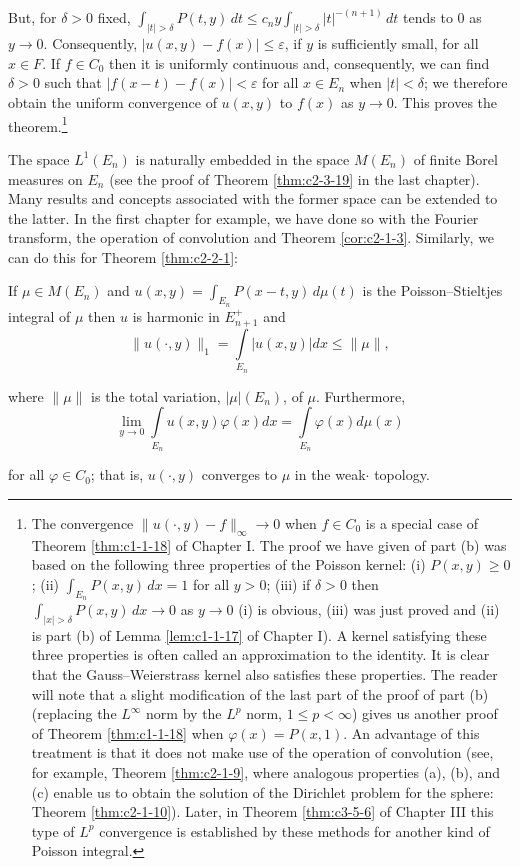 But, for $\delta > 0$ fixed, $\int_{|t| > \delta} P(t, y) \, dt \leq c_n y \int_{|t| > \delta} |t|^{-(n+1)} \, dt$ tends to 0 as $y \to 0$. Consequently, $|u(x, y) - f(x)| \leq \varepsilon$, if $y$ is sufficiently small, for all $x \in F$. If $f \in C_0$ then it is uniformly continuous and, consequently, we can find $\delta > 0$ such that $|f(x-t) - f(x)| < \varepsilon$ for all $x \in E_n$ when $|t| < \delta$; we therefore obtain the uniform convergence of $u(x, y)$ to $f(x)$ as $y \to 0$. This proves the theorem.\footnote{The convergence $\|u(\cdot, y) - f\|_\infty \to 0$ when $f \in C_0$ is a special case of Theorem \ref{thm:c1-1-18} of Chapter I. The proof we have given of part (b) was based on the following three properties of the Poisson kernel: (i) $P(x, y) \geq 0$; (ii) $\int_{E_n} P(x, y) \, dx = 1$ for all $y > 0$; (iii) if $\delta > 0$ then $\int_{|x| > \delta} P(x, y) \, dx \to 0$ as $y \to 0$ (i) is obvious, (iii) was just proved and (ii) is part (b) of Lemma \ref{lem:c1-1-17} of Chapter I). A kernel satisfying these three properties is often called an approximation to the identity. It is clear that the Gauss--Weierstrass kernel also satisfies these properties. The reader will note that a slight modification of the last part of the proof of part (b) (replacing the $L^\infty$ norm by the $L^p$ norm, $1 \leq p < \infty$) gives us another proof of Theorem \ref{thm:c1-1-18} when $\varphi(x) = P(x, 1)$. An advantage of this treatment is that it does not make use of the operation of convolution (see, for example, Theorem \ref{thm:c2-1-9}, where analogous properties (a), (b), and (c) enable us to obtain the solution of the Dirichlet problem for the sphere: Theorem \ref{thm:c2-1-10}). Later, in Theorem \ref{thm:c3-5-6} of Chapter III this type of $L^p$ convergence is established by these methods for another kind of Poisson integral.}

The space $L^{1}(E_{n})$ is naturally embedded in the space $M(E_{n})$ of finite Borel measures on $E_{n}$ (see the proof of Theorem \ref{thm:c2-3-19} in the last chapter). Many results and concepts associated with the former space can be extended to the latter. In the first chapter for example, we have done so with the Fourier transform, the operation of convolution and Theorem \ref{cor:c2-1-3}. Similarly, we can do this for Theorem \ref{thm:c2-2-1}:

\begin{theorem}
\label{thm:c2-2-3}
If $\mu \in M(E_n)$ and $u(x, y) = \int_{E_n} P(x - t, y) \, d\mu(t)$ is the Poisson--Stieltjes integral of $\mu$ then $u$ is harmonic in $E_{n+1}^{+}$ and
\begin{equation}\label{eq:c2-2-4}
\|u(\cdot,y)\|_{1}=\int\limits_{E_{n}}|u(x,y)|d x\leq\|\mu\|,
\end{equation}

where $\|\mu\|$ is the total variation, $|\mu|(E_{n})$, of $\mu$. Furthermore,
\[
\lim_{y\to0}\int\limits_{E_{n}}u(x,y)\varphi(x)dx=\int\limits_{E_{n}}\varphi(x)d\mu(x)
\]

for all $\varphi \in C_0$; that is, $u(\cdot, y)$ converges to $\mu$ in the weak$\cdot$ topology.
\end{theorem}

